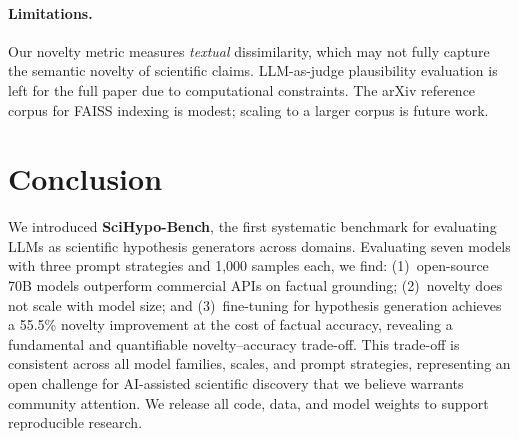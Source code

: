\documentclass{article}
\begin{document}
\paragraph{Limitations.}
Our novelty metric measures \emph{textual} dissimilarity, which may not
fully capture the semantic novelty of scientific claims.
LLM-as-judge plausibility evaluation is left for the full paper due to
computational constraints.
The arXiv reference corpus for FAISS indexing is modest; scaling to a
larger corpus is future work.

\section{Conclusion}
\label{sec:conclusion}

We introduced \textbf{SciHypo-Bench}, the first systematic benchmark for
evaluating LLMs as scientific hypothesis generators across domains.
Evaluating seven models with three prompt strategies and 1{,}000 samples each,
we find: (1)~open-source 70B models outperform commercial APIs on factual
grounding; (2)~novelty does not scale with model size; and (3)~fine-tuning
for hypothesis generation achieves a 55.5\% novelty improvement at the cost
of factual accuracy, revealing a fundamental and quantifiable novelty--accuracy
trade-off.
This trade-off is consistent across all model families, scales, and prompt
strategies, representing an open challenge for AI-assisted scientific
discovery that we believe warrants community attention.
We release all code, data, and model weights to support reproducible research.



\end{document}
